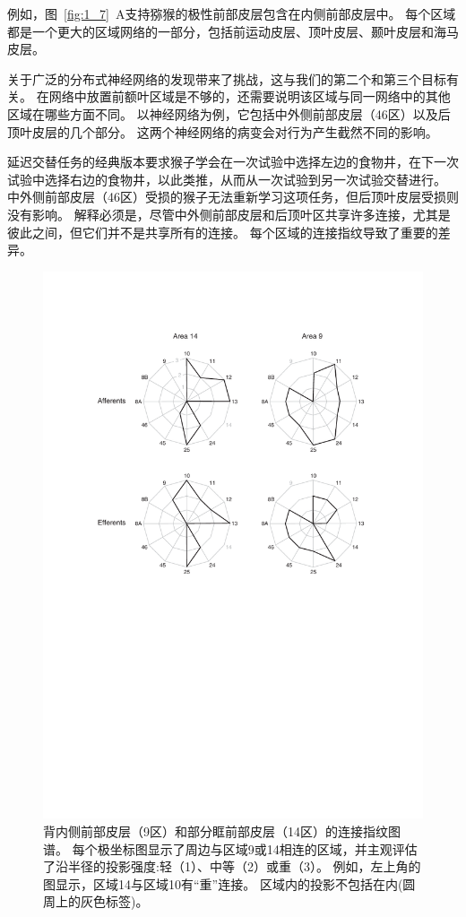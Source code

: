 \par
例如，图~\ref{fig:1_7}~A支持猕猴的极性前部皮层包含在内侧前部皮层中。
每个区域都是一个更大的区域网络的一部分，包括前运动皮层、顶叶皮层、颞叶皮层和海马皮层。


\par
关于广泛的分布式神经网络的发现带来了挑战，这与我们的第二个和第三个目标有关。
在网络中放置前额叶区域是不够的，还需要说明该区域与同一网络中的其他区域在哪些方面不同。
以神经网络为例，它包括中外侧前部皮层（46区）以及后顶叶皮层的几个部分。
这两个神经网络的病变会对行为产生截然不同的影响。


\par
延迟交替任务的经典版本要求猴子学会在一次试验中选择左边的食物井，在下一次试验中选择右边的食物井，以此类推，从而从一次试验到另一次试验交替进行。
中外侧前部皮层（46区）受损的猴子无法重新学习这项任务\cite{butters1969retention}，但后顶叶皮层受损则没有影响\cite{ettlinger1966tactile}。
解释必须是，尽管中外侧前部皮层和后顶叶区共享许多连接，尤其是彼此之间，但它们并不是共享所有的连接。
每个区域的连接指纹导致了重要的差异。


\begin{figure}[!htb]
	\centering
	\includegraphics[width=0.5\linewidth]{chap1/1_6}
	\caption{背内侧前部皮层（9区）和部分眶前部皮层（14区）的连接指纹图谱。
		每个极坐标图显示了周边与区域9或14相连的区域，并主观评估了沿半径的投影强度:轻（1）、中等（2）或重（3）。
		例如，左上角的图显示，区域14与区域10有“重”连接。
		区域内的投影不包括在内(圆周上的灰色标签)\cite{2002Dorsal}。 \label{fig:1_6}}
\end{figure}


